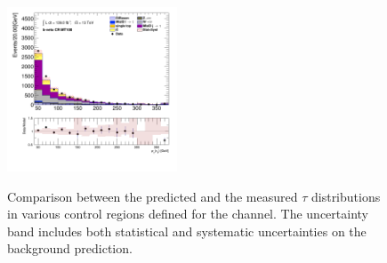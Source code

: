 \begin{figure}[!thp]
\begin{center}
			\includegraphics[width=0.45\textwidth]{chapters/chapter6_HPlus/images/taujets/tau_0_pt_BVETO_MT100.png} \\
			\end{center}
			\caption{
			Comparison between the predicted and the measured $\tau$ \pt distributions in various control regions defined for the \taujets channel. The uncertainty band includes both statistical and systematic uncertainties on the background prediction. 
			}
			\label{fig:bkg-tau-pt-taujets}
		\end{figure}


